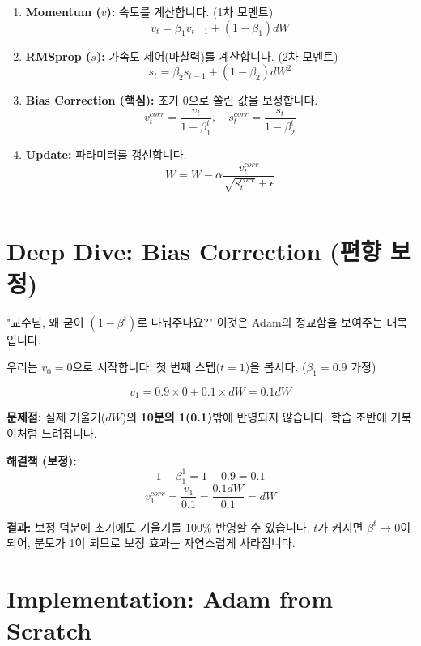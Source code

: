 \documentclass[11pt,a4paper]{book}
\theoremstyle{definition}
\begin{document}
\begin{enumerate}
    \item \textbf{Momentum ($v$):} 속도를 계산합니다. (1차 모멘트)
    $$ v_t = \beta_1 v_{t-1} + (1 - \beta_1) dW $$
    
    \item \textbf{RMSprop ($s$):} 가속도 제어(마찰력)를 계산합니다. (2차 모멘트)
    $$ s_t = \beta_2 s_{t-1} + (1 - \beta_2) dW^2 $$
    
    \item \textbf{Bias Correction (핵심):} 초기 0으로 쏠린 값을 보정합니다.
    $$ v^{corr}_t = \frac{v_t}{1 - \beta_1^t}, \quad s^{corr}_t = \frac{s_t}{1 - \beta_2^t} $$
    
    \item \textbf{Update:} 파라미터를 갱신합니다.
    $$ W = W - \alpha \frac{v^{corr}_t}{\sqrt{s^{corr}_t} + \epsilon} $$
\end{enumerate}

\vspace{0.5cm}\hrule\vspace{0.5cm}

\section{Deep Dive: Bias Correction (편향 보정)}

"교수님, 왜 굳이 $(1 - \beta^t)$로 나눠주나요?"
이것은 Adam의 정교함을 보여주는 대목입니다.

\begin{mathbox}[title={초기값 0의 저주}]
우리는 $v_0 = 0$으로 시작합니다. 첫 번째 스텝($t=1$)을 봅시다.
($\beta_1 = 0.9$ 가정)

$$ v_1 = 0.9 \times 0 + 0.1 \times dW = 0.1 dW $$

\textbf{문제점:} 실제 기울기($dW$)의 \textbf{10분의 1(0.1)}밖에 반영되지 않습니다. 학습 초반에 거북이처럼 느려집니다.

\textbf{해결책 (보정):}
$$ 1 - \beta_1^1 = 1 - 0.9 = 0.1 $$
$$ v^{corr}_1 = \frac{v_1}{0.1} = \frac{0.1 dW}{0.1} = dW $$

\textbf{결과:} 보정 덕분에 초기에도 기울기를 100\% 반영할 수 있습니다.
$t$가 커지면 $\beta^t \to 0$이 되어, 분모가 1이 되므로 보정 효과는 자연스럽게 사라집니다.
\end{mathbox}

\section{Implementation: Adam from Scratch}
\end{document}
